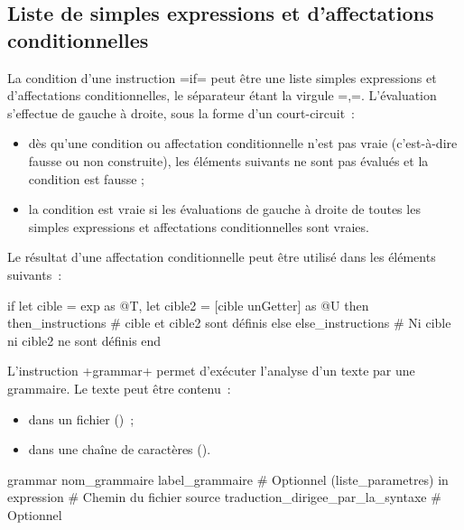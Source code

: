 \subsection{Liste de simples expressions et d'affectations conditionnelles}

La condition d'une instruction \ggs=if= peut être une liste simples expressions et d'affectations conditionnelles, le séparateur étant la virgule \ggs=,=. L'évaluation s'effectue de gauche à droite, sous la forme d'un court-circuit~:
\begin{itemize}
\item dès qu'une condition ou affectation conditionnelle n'est pas vraie (c'est-à-dire fausse ou non construite), les éléments suivants ne sont pas évalués et la condition est fausse ;
\item la condition est vraie si les évaluations de gauche à droite de toutes les simples expressions et affectations conditionnelles sont vraies.
\end{itemize}

Le résultat d'une affectation conditionnelle peut être utilisé dans les éléments suivants~:
\begin{galgas}
if let cible = exp as @T, let cible2 = [cible unGetter] as @U then
  then_instructions # cible et cible2 sont définis
else
  else_instructions # Ni cible ni cible2 ne sont définis
end
\end{galgas}








L'instruction \ggs+grammar+ permet d'exécuter l'analyse d'un texte par une grammaire. Le texte peut être contenu~:
\begin{itemize}
  \item dans un fichier ()~;
  \item dans une chaîne de caractères ().
\end{itemize}











\begin{galgasbox}
grammar
  nom_grammaire
  label_grammaire # Optionnel
  (liste_parametres)
  in expression # Chemin du fichier source
  traduction_dirigee_par_la_syntaxe # Optionnel
\end{galgasbox}

